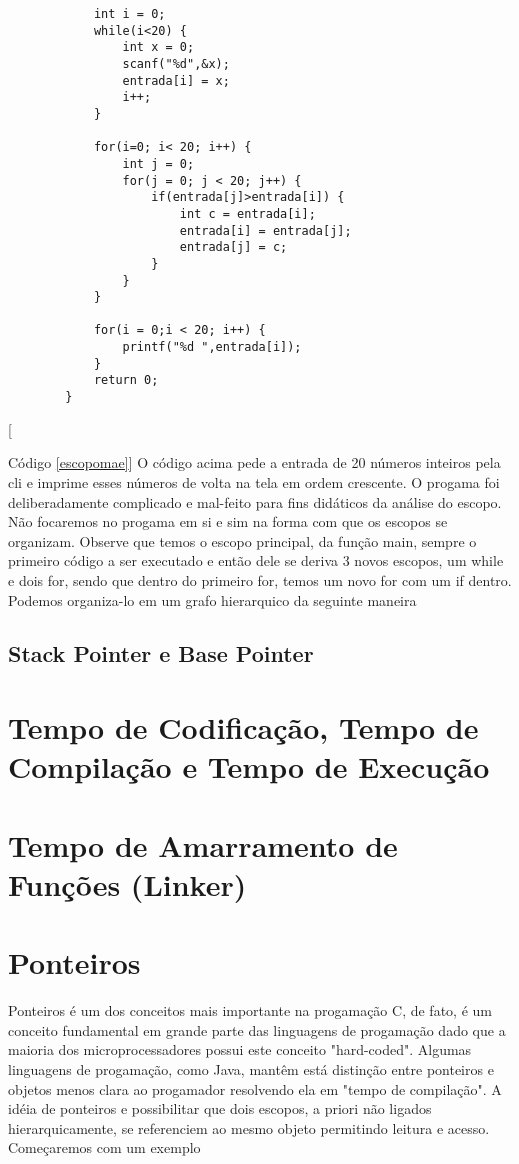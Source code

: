 \documentclass{amsbook}
\begin{document}
{{{{\begin{lstlisting}
			int i = 0;
			while(i<20) {
				int x = 0;
				scanf("%d",&x);
				entrada[i] = x;
				i++;
			}

			for(i=0; i< 20; i++) {
				int j = 0;
				for(j = 0; j < 20; j++) {
					if(entrada[j]>entrada[i]) {
						int c = entrada[i];
						entrada[i] = entrada[j];
						entrada[j] = c;
					}
				}
			}

			for(i = 0;i < 20; i++) {
				printf("%d ",entrada[i]);
			}
			return 0;
		}
		\end{lstlisting}[{\label{escopomae}Código \ref{escopomae}] O código acima pede a entrada de 20 números inteiros pela cli e imprime esses números de volta na tela em ordem crescente. O progama foi deliberadamente complicado e mal-feito para fins didáticos da análise do escopo. Não focaremos no progama em si e sim na forma com que os escopos se organizam. Observe que temos o escopo principal, da função main, sempre o primeiro código a ser executado e então dele se deriva 3 novos escopos, um while e dois for, sendo que dentro do primeiro for, temos um novo for com um if dentro. Podemos organiza-lo em um grafo hierarquico da seguinte maneira

		

		\subsection{Stack Pointer e Base Pointer}


\section{Tempo de Codificação, Tempo de Compilação e Tempo de Execução}

\section{Tempo de Amarramento de Funções (Linker)}

\section{Ponteiros}

	Ponteiros é um dos conceitos mais importante na progamação C, de fato, é um conceito fundamental em grande parte das linguagens de progamação dado que a maioria dos microprocessadores possui este conceito "hard-coded". Algumas linguagens de progamação, como Java, mantêm está distinção entre ponteiros e objetos menos clara ao progamador resolvendo ela em "tempo de compilação". A idéia de ponteiros e possibilitar que dois escopos, a priori não ligados hierarquicamente, se referenciem ao mesmo objeto permitindo leitura e acesso. Começaremos com um exemplo

}}}}}
\end{document}

